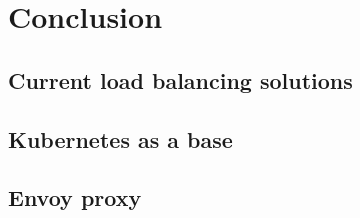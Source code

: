 \chapter{Conclusion}

\section{Current load balancing solutions}

\section{Kubernetes as a base}

\section{Envoy proxy}
